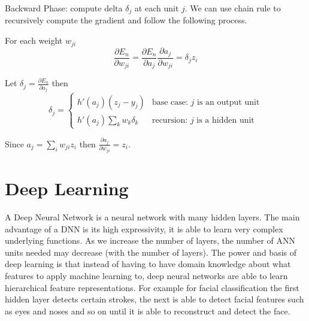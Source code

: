 \documentclass[12pt]{article}
\begin{document}
                Backward Phase: compute delta $\delta_j$ at each unit $j$. We can use chain rule to recursively compute
                the gradient and follow the following process.
                
                For each weight $w_{ji}$
                $$ \frac{\partial E_n}{\partial w_{ji}} = \frac{\partial E_n}{\partial a_{j}} \frac{\partial
                a_j}{\partial w_{ji}} = \delta_{j} z_i $$ 

                Let $\delta_j = \frac{\partial E_n}{\partial a_{j}}$ then
                \[ \delta_j = \begin{cases} 
                    h'(a_j)(z_j - y_j) & \text{base case: $j$ is an output unit} \\
                    h'(a_j)\sum_k w_k \delta_k & \text{recursion: $j$ is a hidden unit}
                    \end{cases}
                \]
                
                Since $a_j = \sum_i w_{ji}z_i$ then $\frac{\partial a_j}{\partial w_{ji}} = z_i$.

\section{Deep Learning}
    A Deep Neural Network is a neural network with many hidden layers. The main advantage of a DNN is its high
    expressivity, it is able to learn very complex underlying functions. As we increase the number of layers, the number
    of ANN units needed may decrease (with the number of layers). The power and basis of deep learning is that instead
    of having to have domain knowledge about what features to apply machine learning to, deep neural networks are able
    to learn hierarchical feature representations. For example for facial classification the first hidden layer detects
    certain strokes, the next is able to detect facial features such as eyes and noses and so on until it is able to
    reconstruct and detect the face.
    
\end{document}
